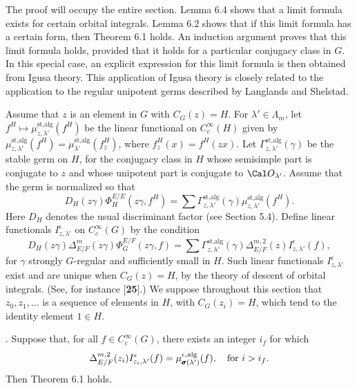 The proof will occupy the entire section.  Lemma 6.4 shows that a limit formula
exists for certain orbital integrals.  Lemma 6.2 shows that if this limit formula has
a certain form, then Theorem 6.1 holds.  An induction argument proves that this
limit formula holds, provided that it holds for a particular conjugacy class in $G$.
In this special case, an explicit expression for this limit
formula is then obtained from Igusa theory.  This application of Igusa theory 
is closely related to the application to the regular unipotent germs described
by Langlands and Shelstad.  

Assume that $z$ is an element in $G$ with $C_G(z) = H$.  For $\lambda'\in\Lambda_m$,
let $f^H\mapsto \mu_{z,\lambda'}^{\text{st,alg}}(f^H)$ be the linear
functional on $C_c^\infty(H)$ given by 
	$\mu_{z,\lambda'}^{\text{st,alg}}(f^H)=
\mu_{\lambda'}^{\text{st,alg}}(f^H_z)$, where $f^H_z(x) = f^H(zx)$.
Let $\Gamma^{\text{st,alg}}_{z,\lambda'}(\gamma)$ be the stable germ
on $H$, for the conjugacy class in $H$ whose semisimple part is
conjugate to $z$ and whose unipotent part is conjugate
to ${\Cal O}_{\lambda'}$.  Assume that the germ is normalized
so that
$$D_H(z\gamma)\Phi^{E/E}_H(z\gamma,f^H) = \sum \Gamma^{\text{st,alg}}_{z,\lambda'}
(\gamma)\mu_{z,\lambda'}^{\text{st,alg}}(f^H).$$
Here $D_H$ denotes the usual discriminant factor (see Section 5.4).
Define linear functionals $I^{\epsilon}_{z,\lambda'}$ on 
$C_c^\infty(G)$ by the condition
$$D_H(z\gamma)\Delta^m_{E/F}(z\gamma)\Phi^{E/F}_G(z\gamma,f) = 
	\sum\Gamma^{\text{st,alg}}_{z,\lambda'}(\gamma)\Delta^{m,2}_{E/F}(z)
	I^{\epsilon}_{z,\lambda'}(f),$$
for $\gamma$ strongly $G$-regular and sufficiently small in $H$.
Such linear functionals $I^{\epsilon}_{z,\lambda'}$ exist
and are unique when $C_G(z) = H$, by the theory of descent of
orbital integrals.  (See, for instance [{\bf 25}].)
We suppose throughout this section that $z_0,z_1,\ldots$ is a sequence
of elements in $H$, with $C_G(z_i) = H$, which tend to the identity
element $1\in H$.  

.  
Suppose that, for all $f\in C_c^\infty (G)$, there exists
an integer $i_f$ for which
$$\Delta^{m,2}_{E/F}(z_i)I^{\epsilon}_{z_i,\lambda'}(f)
	= \mu^{\epsilon,\text{alg}}_{\pmb\sigma(\lambda')}(f),\ \ \text{ for }
	i>i_f.\hss$$
Then Theorem 6.1 holds.
\finishproclaim

